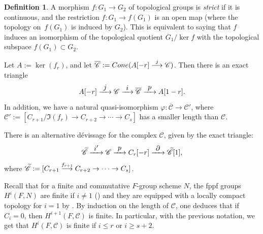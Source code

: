 \documentclass[11pt]{article}
\let\mathcal\mathscr
\newcommand\To[1]{\mathchoice{\xrightarrow{\textstyle\kern4pt#1\kern3pt}}{\stackrel{#1}{\longrightarrow}}{}{}}
\theoremstyle{plain}
\theoremstyle{definition}
\newtheorem{defi}[theo]{Definition}
\newcommand \cC {\mathcal{C}}
\begin{document}
\begin{defi}
A morphism $f: G_1 \to G_2$
of topological groups is \emph{strict} if it is continuous, and
the restriction $f: G_1 \to f(G_1)$ is
an open map (where the topology on~$f(G_1)$ is induced by $G_2$). This is
equivalent to saying that $f$ induces an isomorphism of the topological
quotient $G_1/\ker f$ with the topological subspace $f(G_1) \subset G_2$.
\end{defi}

Let $A:= \ker(f_r)$, and let $\overline{\cC}:= \textup{Cone}(A[-r] \To{j} \cC)$. Then there is an exact triangle%
\begin{equation} \label{devissage complexe}
A[-r] \To{j} \cC \To{i} \overline{\cC} \To{p} A[1-r].
\end{equation}
In addition, we have a natural quasi-isomorphism $\varphi: \overline{\cC} \to \cC'$, where $\cC':= [C_{r+1}/\Im (f_r) \to C_{r+2} \to \cdots\to C_s]$ has a smaller length than $\cC$.

There is an alternative dévissage for the complex $\cC$, given by
the exact triangle:
\begin{equation} \label{devissage complexe bis}
\widetilde{\cC} \To{i'} \cC \To{p} C_r[-r] \To{\partial} \widetilde{\cC}[1],
\end{equation}
where $\widetilde{\cC}:= [C_{r+1} \To{f_{r+1}} C_{r+2} \to \cdots\to C_s]$.

Recall that for a finite and commutative $F$-group scheme $N$, the fppf groups
$H^i(F,N)$ are finite if $i \neq 1$ (\cite[\S III.6]{MilADT}) and they are
equipped with a locally compact topology for $i=1$ by \cite{Ces}.
By induction on the length of $\cC$, one deduces that if $C_i = 0$, then $H^{i+1}(F, \cC)$ is finite. In particular, with the previous notation, we get that $H^i(F, \cC)$ is finite if $i \leq r$ or $i \geq s+2$.
\end{document}
